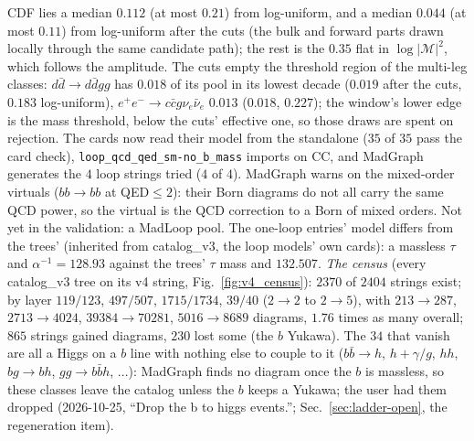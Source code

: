 \documentclass[11pt]{article}
\newcommand{\code}[1]{\texttt{#1}}
\begin{document}
CDF lies a median $0.112$ (at most $0.21$) from log-uniform, and a median $0.044$ (at most $0.11$) from log-uniform
after the cuts (the bulk and forward parts drawn locally through the same candidate path); the rest is the
$0.35$ flat in $\log|\mathcal M|^2$, which follows the amplitude. The cuts empty the threshold region of the
multi-leg classes: $d\bar d\to d\bar dgg$ has $0.018$ of its pool in its lowest decade ($0.019$ after the cuts,
$0.183$ log-uniform), $e^+e^-\to c\bar cg\nu_e\bar\nu_e$ $0.013$ ($0.018$, $0.227$); the window's lower edge is the
mass threshold, below the cuts' effective one, so those draws are spent on rejection. The cards now read their
model from the standalone ($35$ of $35$ pass the card check), \code{loop\_qcd\_qed\_sm-no\_b\_mass} imports on CC,
and MadGraph generates the $4$ loop strings tried ($4$ of $4$). MadGraph warns on the mixed-order virtuals ($b b\to
bb$ at QED$\le2$): their Born diagrams do not all carry the same QCD power, so the virtual is the QCD correction to
a Born of mixed orders. Not yet in the validation: a MadLoop pool. The one-loop entries' model differs from the
trees' (inherited from catalog\_v3, the loop models' own cards):
a massless $\tau$ and $\alpha^{-1}=128.93$ against the trees' $\tau$ mass and $132.507$.
\emph{The census} (every catalog\_v3 tree on its v4 string, Fig.~\ref{fig:v4_census}): $2370$ of $2404$ strings
exist; by layer $119/123$, $497/507$, $1715/1734$, $39/40$ ($2\to2$ to $2\to5$), with $213\to287$, $2713\to4024$,
$39384\to70281$, $5016\to8689$ diagrams, $1.76$ times as many overall; $865$ strings gained diagrams, $230$ lost some
(the $b$ Yukawa). The $34$ that vanish are all a Higgs on a $b$ line with nothing else to couple to it
($b\bar b\to h$, $h+\gamma/g$, $hh$, $bg\to bh$, $gg\to b\bar bh$, ...): MadGraph finds no diagram once the $b$ is
massless, so these classes leave the catalog unless the $b$ keeps a Yukawa; the user had them dropped (2026-10-25, ``Drop the b to higgs events.'';
Sec.~\ref{sec:ladder-open}, the regeneration item).
\end{document}
